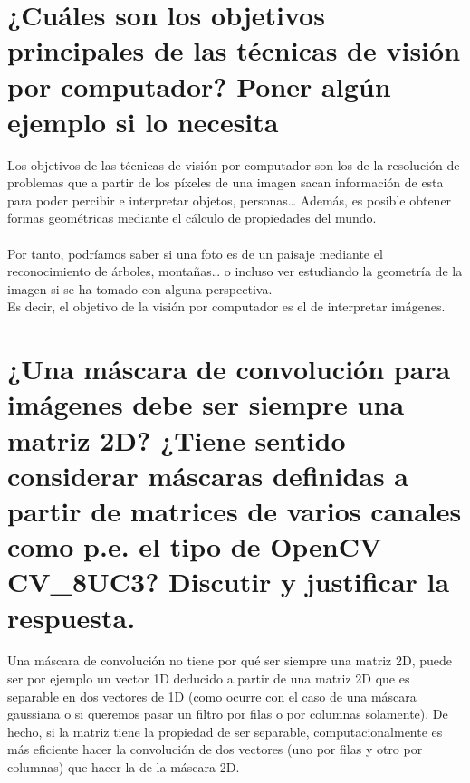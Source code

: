 \newpage %

\tableofcontents %


\newpage




\section{¿Cuáles son los objetivos principales de las técnicas de visión por computador? Poner algún ejemplo si lo necesita}

Los objetivos de las técnicas de visión por computador son los de la resolución de problemas que a partir de los píxeles de una imagen sacan información de esta para poder percibir e interpretar objetos, personas… Además, es posible obtener formas geométricas mediante el cálculo de propiedades del mundo.\\
\\
Por tanto, podríamos saber si una foto es de un paisaje mediante el reconocimiento de árboles, montañas… o incluso ver estudiando la geometría de la imagen si se ha tomado con alguna perspectiva.\\
Es decir, el objetivo de la visión por computador es el de interpretar imágenes.

\section{¿Una máscara de convolución para imágenes debe ser siempre una matriz 2D? ¿Tiene sentido considerar máscaras definidas a partir de matrices de varios canales como p.e. el tipo de OpenCV CV\_8UC3? Discutir y justificar la respuesta.}

Una máscara de convolución no tiene por qué ser siempre una matriz 2D, puede ser por ejemplo un vector 1D deducido a partir de una matriz 2D que es separable en dos vectores de 1D (como  ocurre con el caso de una máscara gaussiana o si queremos pasar un filtro por filas o por columnas solamente).  De hecho, si la matriz tiene la propiedad de ser separable, computacionalmente es más eficiente hacer la convolución de dos vectores (uno por filas y otro por columnas) que hacer la de la máscara 2D.\\

